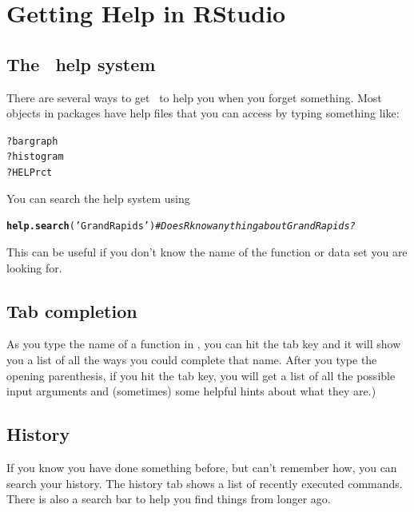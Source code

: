 \documentclass[twoside]{book}\usepackage[]{graphicx}\usepackage[]{xcolor}
\makeatletter
\newcommand{\hlstr}[1]{\textcolor[rgb]{0.192,0.494,0.8}{#1}}%
\newcommand{\hlcom}[1]{\textcolor[rgb]{0.678,0.584,0.686}{\textit{#1}}}%
\newcommand{\hlopt}[1]{\textcolor[rgb]{0,0,0}{#1}}%
\newcommand{\hlstd}[1]{\textcolor[rgb]{0.345,0.345,0.345}{#1}}%
\newcommand{\hlkwd}[1]{\textcolor[rgb]{0.737,0.353,0.396}{\textbf{#1}}}%
\newenvironment{kframe}{%
 \def\at@end@of@kframe{}%
 \ifinner\ifhmode%
  \def\at@end@of@kframe{\end{minipage}}%
  \begin{minipage}{\columnwidth}%
 \fi\fi%
 \def\FrameCommand##1{\hskip\@totalleftmargin \hskip-\fboxsep
 \colorbox{shadecolor}{##1}\hskip-\fboxsep
     \hskip-\linewidth \hskip-\@totalleftmargin \hskip\columnwidth}%
 \MakeFramed {\advance\hsize-\width
   \@totalleftmargin\z@ \linewidth\hsize
   \@setminipage}}%
 {\par\unskip\endMakeFramed%
 \at@end@of@kframe}
\newenvironment{knitrout}{}{} %
\makeatother
\begin{document}
\section{Getting Help in RStudio}

\subsection{The \RStudio\ help system}
There are several ways to get \RStudio\ to help you when you forget something.
Most objects in packages have help files that you can access by typing something 
like:
\begin{knitrout}
\color{fgcolor}\begin{kframe}
\begin{alltt}
\hlopt{?}\hlstd{bargraph}
\hlopt{?}\hlstd{histogram}
\hlopt{?}\hlstd{HELPrct}
\end{alltt}
\end{kframe}
\end{knitrout}
You can search the help system using
\begin{knitrout}
\color{fgcolor}\begin{kframe}
\begin{alltt}
\hlkwd{help.search}\hlstd{(}\hlstr{'Grand Rapids'}\hlstd{)}    \hlcom{# Does R know anything about Grand Rapids?}
\end{alltt}
\end{kframe}
\end{knitrout}
This can be useful if you don't know the name of the function or data set you 
are looking for.

\subsection{Tab completion}
As you type the name of a function in \RStudio, you can hit the tab key and it
will show you a list of all the ways you could complete that name. After
you type the opening parenthesis, if you hit the tab key, you will get a list
of all the possible input arguments and (sometimes) some helpful hints about what they are.)

\subsection{History}
If you know you have done something before, but can't remember how, you can
search your history.  The history tab shows a list of recently executed
commands.  There is also a search bar to help you find things from longer ago.
\end{document}
